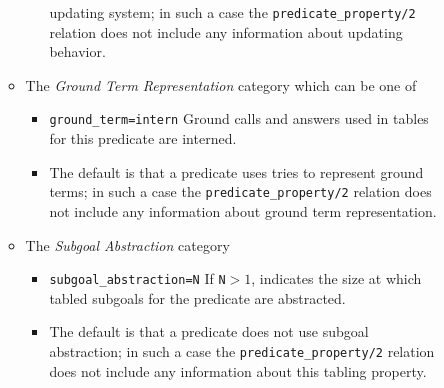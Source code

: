 \begin{description}
\begin{itemize}
\begin{itemize}
\begin{itemize}
  updating system; in such a case the {\tt predicate\_property/2}
  relation does not include any information about updating behavior.
\end{itemize}
%
\item The {\em Ground Term Representation} category which can be one
  of
\begin{itemize}
\item{\tt ground\_term=intern} Ground calls and answers used in
  tables for this predicate are interned.
\item The default is that a predicate uses tries to represent ground
  terms; in such a case the {\tt predicate\_property/2} relation does
  not include any information about ground term representation.
\end{itemize}
\item The {\em Subgoal Abstraction} category
\begin{itemize}
\item{\tt subgoal\_abstraction=N}  If {\tt N}$>1$, indicates the size at
  which tabled subgoals for the predicate are abstracted.
%
\item The default is that a predicate does not use subgoal
  abstraction; in such a case the {\tt predicate\_property/2} relation
  does not include any information about this tabling property.


\end{itemize}
\end{itemize}
\end{itemize}
\end{description}
